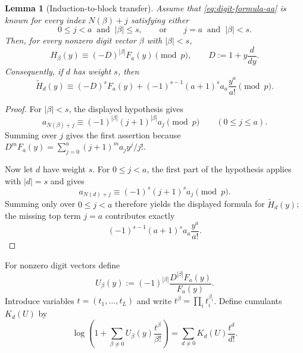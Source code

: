 \documentclass[11pt]{amsart}
\numberwithin{equation}{section}
\newtheorem{lemma}[lemma]{Lemma}
\begin{document}
\begin{lemma}[Induction-to-block transfer]\label{lem:block-transfer}
Assume that \eqref{eq:digit-formula-aa} is known for every index $N(\beta)+j$ satisfying either
\[
        0\le j<a\ \text{ and }\ |\beta|\le s,
        \qquad\text{or}\qquad
        j=a\ \text{ and }\ |\beta|<s.
\]
Then, for every nonzero digit vector $\beta$ with $|\beta|<s$,
\[
        H_\beta(y)\equiv (-D)^{|\beta|}F_a(y)\pmod p,
        \qquad
        D:=1+y\frac{d}{dy}.
\]
Consequently, if $d$ has weight $s$, then
\[
        \widetilde H_d(y)\equiv (-D)^sF_a(y)+(-1)^{s-1}(a+1)^s a_a\frac{y^a}{a!}\pmod p.
\]
\end{lemma}
\begin{proof}
For $|\beta|<s$, the displayed hypothesis gives
\[
        a_{N(\beta)+j}\equiv (-1)^{|\beta|}(j+1)^{|\beta|}a_j\pmod p
        \qquad(0\le j\le a).
\]
Summing over $j$ gives the first assertion because $D^mF_a(y)=\sum_{j=0}^a(j+1)^ma_jy^j/j!$.

Now let $d$ have weight $s$.  For $0\le j<a$, the first part of the hypothesis applies with $|d|=s$ and gives
\[
        a_{N(d)+j}\equiv (-1)^s(j+1)^sa_j\pmod p.
\]
Summing only over $0\le j<a$ therefore yields the displayed formula for $\widetilde H_d(y)$; the missing top term $j=a$ contributes exactly
\[
        (-1)^{s-1}(a+1)^sa_a\frac{y^a}{a!}.
\]
\end{proof}

For nonzero digit vectors define
\[
        U_\beta(y):=(-1)^{|\beta|}\frac{D^{|\beta|}F_a(y)}{F_a(y)}.
\]
Introduce variables $t=(t_1,\ldots,t_L)$ and write $t^\beta=\prod_i t_i^{\beta_i}$.  Define cumulants $K_d(U)$ by
\begin{equation}\label{eq:cumulants}
        \log\left(1+\sum_{\beta\ne0}U_\beta(y)\frac{t^\beta}{\beta!}\right)
        =\sum_{d\ne0}K_d(U)\frac{t^d}{d!}.
\end{equation}
\end{document}
